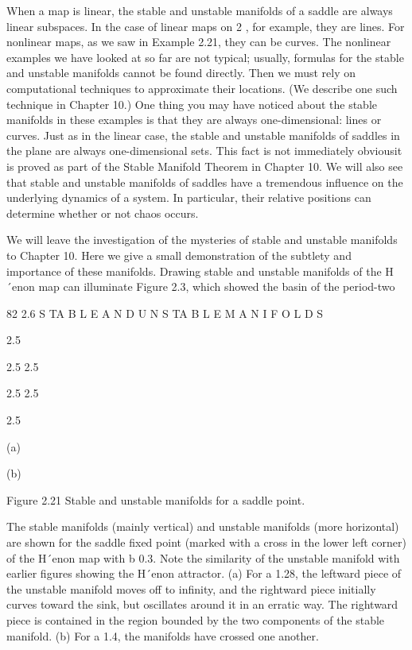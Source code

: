 \documentclass[12pt]{article}
\begin{document}
When a map is linear, the stable and unstable manifolds of a saddle are always linear subspaces. In the case of linear maps on  2 , 
for example, they are lines. For nonlinear maps, as we saw in Example 2.21, they can be curves. The nonlinear examples we have looked 
at so far are not typical; usually, formulas for the stable and unstable manifolds cannot be found directly. Then we must rely on 
computational techniques to approximate their locations. (We describe one such technique in Chapter 10.) One thing you may have 
noticed about the stable manifolds in these examples is that they are always one-dimensional: lines or curves. Just as in the linear 
case, the stable and unstable manifolds of saddles in the plane are always one-dimensional sets. This fact is not immediately 
obviousit is proved as part of the Stable Manifold Theorem in Chapter 10. We will also see that stable and unstable manifolds of 
saddles have a tremendous inﬂuence on the underlying dynamics of a system. In particular, their relative positions can determine 
whether or not chaos occurs.

We will leave the investigation of the mysteries of stable and unstable manifolds to Chapter 10. Here we give a small demonstration 
of the subtlety and importance of these manifolds. Drawing stable and unstable manifolds of the H´enon map can illuminate Figure 2.3, 
which showed the basin of the period-two

82 2.6 S TA B L E A N D U N S TA B L E M A N I F O L D S

2.5

2.5 2.5

2.5 2.5

2.5

(a)

(b)

Figure 2.21 Stable and unstable manifolds for a saddle point.

The stable manifolds (mainly vertical) and unstable manifolds (more horizontal) are shown for the saddle ﬁxed point (marked with a 
cross in the lower left corner) of the H´enon map with b  0.3. Note the similarity of the unstable manifold with earlier ﬁgures 
showing the H´enon attractor. (a) For a  1.28, the leftward piece of the unstable manifold moves off to inﬁnity, and the rightward 
piece initially curves toward the sink, but oscillates around it in an erratic way. The rightward piece is contained in the region 
bounded by the two components of the stable manifold. (b) For a  1.4, the manifolds have crossed one another.
\end{document}
